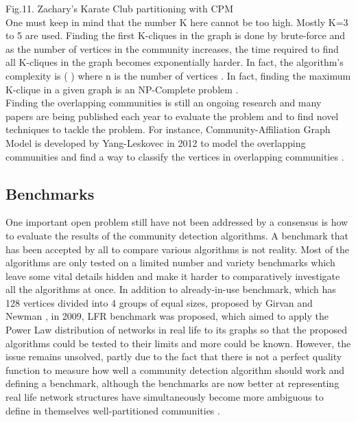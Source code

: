 \documentclass[10pt]{article}
\begin{document}
Fig.11. Zachary’s Karate Club partitioning with CPM \\

One must keep in mind that the number K here cannot be too high. Mostly K=3 to 5 are used. Finding the first K-cliques in the graph is done by brute-force and as the number of vertices in the community increases, the time required to find all K-cliques in the graph becomes exponentially harder. In fact, the algorithm’s complexity is ( ) where n is the number of vertices \cite{eleven}. In fact, finding the maximum K-clique in a given graph is an NP-Complete problem \cite{clique}. \\

Finding the overlapping communities is still an ongoing research and many papers are being published each year to evaluate the problem and to find novel techniques to tackle the problem. For instance, Community-Affiliation Graph Model is developed by Yang-Leskovec in 2012 to model the overlapping communities and find a way to classify the vertices in overlapping communities \cite{overlapping}. \\

\subsection{Benchmarks}
One important open problem still have not been addressed by a consensus is how to evaluate the results of the community detection algorithms. A benchmark that has been accepted by all to compare various algorithms is not reality\cite{fortunato}. Most of the algorithms are only tested on a limited number and variety benchmarks which leave some vital details hidden and make it harder to comparatively investigate all the algorithms at once. In addition to already-in-use benchmark, which has 128 vertices divided into 4 groups of equal sizes, proposed by Girvan and Newman \cite{raghavan}, in 2009, LFR benchmark was proposed, which aimed to apply the Power Law distribution of networks in real life to its graphs so that the proposed algorithms could be tested to their limits and more could be known\cite{cdbible}. However, the issue remains unsolved, partly due to the fact that there is not a perfect quality function to measure how well a community detection algorithm should work and defining a benchmark, although the benchmarks are now better at representing real life network structures have simultaneously become more ambiguous to define in themselves well-partitioned communities \cite{fortunato}. \\
\end{document}
